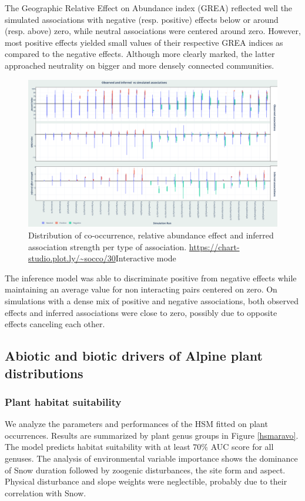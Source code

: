 \documentclass[]{article}
\newcommand{\commG}[1]{#1}
\begin{document}
The Geographic Relative Effect on Abundance index (GREA) reflected well the simulated associations with negative (resp. positive) effects below or around (resp. above) zero, while neutral associations were centered around zero. However, most positive effects yielded small values of their respective GREA indices as compared to the negative effects. Although more clearly marked, the latter approached neutrality on bigger and more densely connected communities. \\ 

\begin{figure}[h]
	\centering
	\commG{\includegraphics[scale=0.25]{patt}}
	\caption{Distribution of co-occurrence, relative abundance effect and inferred association strength per type of association. \url{https://chart-studio.plot.ly/~socco/30}{Interactive mode}}
	\label{patterns}
\end{figure}

The inference model was able to discriminate positive from negative effects while maintaining an average value for non interacting pairs centered on zero. On simulations with a dense mix of positive and negative associations, both observed effects and inferred associations were close to zero, possibly due to opposite effects canceling each other. 

\subsection{Abiotic and biotic drivers of Alpine plant distributions}
\subsubsection{Plant habitat suitability}
We analyze the parameters and performances of the HSM fitted on plant occurrences. Results are summarized by plant genus groups in Figure \ref{hsmaravo}. The model predicts habitat suitability with at least $70\%$ AUC score for all genuses. The analysis of environmental variable importance shows the dominance of Snow duration followed by zoogenic disturbances, the site form and aspect. Physical disturbance and slope weights were neglectible, probably due to their correlation with Snow. 
\end{document}
